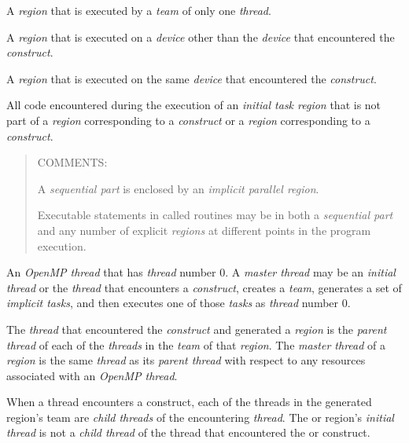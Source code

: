 \smallskip
{}
\glossarydefstart
A  \emph{region} that is executed by a \emph{team} of only 
one \emph{thread}.
\glossarydefend

\glossarydefstart
A  \emph{region} that is executed on a \emph{device} other 
than the \emph{device} that encountered the  \emph{construct}. 
\glossarydefend

\smallskip
{}
\glossarydefstart
A  \emph{region} that is executed on the same \emph{device} 
that encountered the  \emph{construct}.
\glossarydefend

\glossarydefstart
All code encountered during the execution of an \emph{initial task region} 
that is not part of a  \emph{region} corresponding to a 
 \emph{construct} or a 
\emph{region} corresponding to a  \emph{construct}.

\begin{quote}
COMMENTS:

A \emph{sequential part} is enclosed by an \emph{implicit parallel region}.

Executable statements in called routines may be in both a \emph{sequential
part} and any number of explicit  \emph{regions} at different 
points in the program execution.
\end{quote}
\glossarydefend

\glossarydefstart
An \emph{OpenMP thread} that has  \emph{thread} number 0. A \emph{master
thread} may be an \emph{initial thread} or the \emph{thread} that encounters a
 \emph{construct}, creates a \emph{team}, generates a set of
\emph{implicit tasks}, and then executes one of those \emph{tasks} as
\emph{thread} number 0.
\glossarydefend

\glossarydefstart
The \emph{thread} that encountered the  \emph{construct} 
and generated a  \emph{region} is the \emph{parent thread} 
of each of the \emph{threads} in the \emph{team} of that
 \emph{region}. The \emph{master thread}
of a  \emph{region} is the same \emph{thread}
as its \emph{parent thread} with respect to any resources associated with 
an \emph{OpenMP thread}.
\glossarydefend

\glossarydefstart
When a thread encounters a  construct, each of the threads 
in the generated  region's team are \emph{child threads} of 
the encountering \emph{thread}. The  or  region's 
\emph{initial thread} is not a \emph{child thread} of the thread
that encountered the  or  construct.
\glossarydefend

